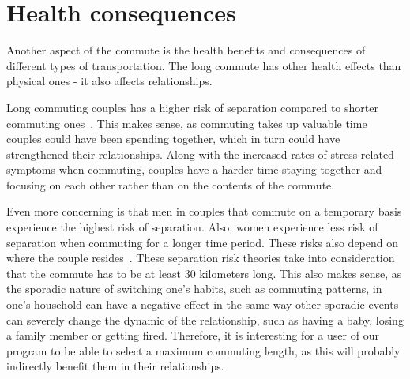 \section{Health consequences}\label{sec:health-consequences}

Another aspect of the commute is the health benefits and consequences of different types of transportation.
The long commute has other health effects than physical ones - it also affects relationships.

Long commuting couples has a higher risk of separation compared to shorter commuting ones~\cite{sandow2011}.
This makes sense, as commuting takes up valuable time couples could have been spending together, which in turn could
have strengthened their relationships.
Along with the increased rates of stress-related symptoms when commuting, couples have a harder time staying together
and focusing on each other rather than on the contents of the commute.

Even more concerning is that men in couples that commute on a temporary basis experience the highest risk of separation.
Also, women experience less risk of separation when commuting for a longer time period.
These risks also depend on where the couple resides~\cite{sandow2011}.
These separation risk theories take into consideration that the commute has to be at least 30 kilometers long.
This also makes sense, as the sporadic nature of switching one's habits, such as commuting patterns, in one's household
can have a negative effect in the same way other sporadic events can severely change the dynamic of the relationship,
such as having a baby, losing a family member or getting fired.
Therefore, it is interesting for a user of our program to be able to select a maximum commuting length, as this will
probably indirectly benefit them in their relationships.
